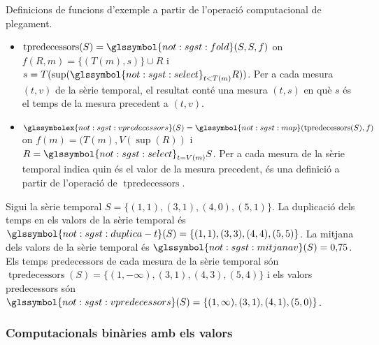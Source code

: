\begin{example}
  Definicions de funcions d'exemple a partir de l'operació
  computacional de plegament. 

\begin{itemize}
\item $\operatorname{tpredecessors}(S)=
  \glssymbol{not:sgst:fold}(S,S,f)$ on $ f(R,m)= \{(T(m),s)\} \cup R$
  i $s=T(\sup( \allowbreak \glssymbol{not:sgst:select}_{t <
    T(m)}R))$. Per a cada mesura $(t,v)$ de la sèrie temporal, el
  resultat conté una mesura $(t,s)$ en què $s$ és el temps de la
  mesura precedent a $(t,v)$.

\item $\glssymbolex{not:sgst:vpredecessors}(S) =
  \glssymbol{not:sgst:map}(\operatorname{tpredecessors}(S), f)$ on
  $f(m)= (T(m), V(\sup(R))$ i $R=
  \glssymbol{not:sgst:select}_{t=V(m)}S$.  Per a cada mesura de la
  sèrie temporal indica quin és el valor de la mesura precedent, és
  una definició a partir de l'operació de
  $\operatorname{tpredecessors}$.

\end{itemize}

\end{example}


\begin{example}
  Sigui la sèrie temporal $S=\{(1,1),(3,1),(4,0),(5,1)\}$. %
  La duplicació dels temps en els valors de la sèrie temporal és
  $\glssymbol{not:sgst:duplica-t}(S)=\{(1,1),(3,3),(4,4),(5,5)\}$. %
  La mitjana dels valors de la sèrie temporal és
  $\glssymbol{not:sgst:mitjanav}(S) = 0{,}75$. %
  Els temps predecessors de cada mesura de la sèrie temporal són
  $\operatorname{tpredecessors}(S)=\{(1,-\infty),(3,1),(4,3),(5,4)\}$
  i els valors predecessors són
  $\glssymbol{not:sgst:vpredecessors}(S)=\{(1,\infty),(3,1),(4,1),(5,0)\}$.
\end{example}




\subsubsection{Computacionals binàries amb els valors}

